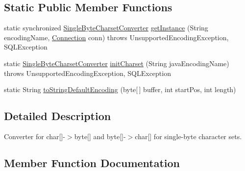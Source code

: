 \subsection*{Static Public Member Functions}
\begin{DoxyCompactItemize}
\item 
static synchronized \mbox{\hyperlink{classcom_1_1mysql_1_1jdbc_1_1_single_byte_charset_converter}{Single\+Byte\+Charset\+Converter}} \mbox{\hyperlink{classcom_1_1mysql_1_1jdbc_1_1_single_byte_charset_converter_a38d3994fc1cbfec7c61d072303f124b5}{get\+Instance}} (String encoding\+Name, \mbox{\hyperlink{interfacecom_1_1mysql_1_1jdbc_1_1_connection}{Connection}} conn)  throws Unsupported\+Encoding\+Exception, S\+Q\+L\+Exception 
\item 
static \mbox{\hyperlink{classcom_1_1mysql_1_1jdbc_1_1_single_byte_charset_converter}{Single\+Byte\+Charset\+Converter}} \mbox{\hyperlink{classcom_1_1mysql_1_1jdbc_1_1_single_byte_charset_converter_a756d8433aca86ef6942c0eb1a106a898}{init\+Charset}} (String java\+Encoding\+Name)  throws Unsupported\+Encoding\+Exception, S\+Q\+L\+Exception 
\item 
static String \mbox{\hyperlink{classcom_1_1mysql_1_1jdbc_1_1_single_byte_charset_converter_af6ab6e344ea9ea06b62ef3476c5e17cf}{to\+String\+Default\+Encoding}} (byte\mbox{[}$\,$\mbox{]} buffer, int start\+Pos, int length)
\end{DoxyCompactItemize}


\subsection{Detailed Description}
Converter for char\mbox{[}\mbox{]}-\/$>$byte\mbox{[}\mbox{]} and byte\mbox{[}\mbox{]}-\/$>$char\mbox{[}\mbox{]} for single-\/byte character sets. 

\subsection{Member Function Documentation}
\mbox{\label{classcom_1_1mysql_1_1jdbc_1_1_single_byte_charset_converter_a38d3994fc1cbfec7c61d072303f124b5}} 
